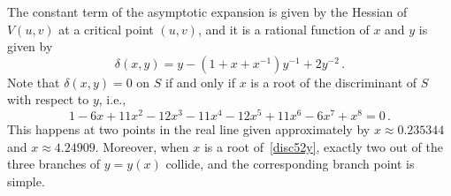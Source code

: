 \documentclass[12pt,reqno]{amsart}
\theoremstyle{definition}
\begin{document}
The constant term of the asymptotic expansion is given by the Hessian
of $V(u,v)$ at a critical point $(u,v)$, and it is a rational
function of $x$ and $y$ is given by 
\begin{equation}
  \label{52delta}
  \delta(x,y) = y-(1+x+x^{-1})y^{-1}+2y^{-2} \, .
\end{equation}
Note that $\delta(x,y)=0$ on $S$ if and only if $x$ is a root of the
discriminant of $S$ with respect to $y$, i.e., 
\begin{equation}
\label{disc52y}
1 - 6 x + 11 x^2 - 12 x^3 - 11 x^4 - 12 x^5 + 11 x^6 - 6 x^7 + x^8 =
0 \,.
\end{equation}
This happens at two points in the real line given approximately by
$ x \approx 0.235344$ and $x \approx 4.24909$. Moreover, when $x$
is a root of~\eqref{disc52y}, exactly two out of the three branches
of $y=y(x)$ collide, and the corresponding branch point is simple.
\end{document}
